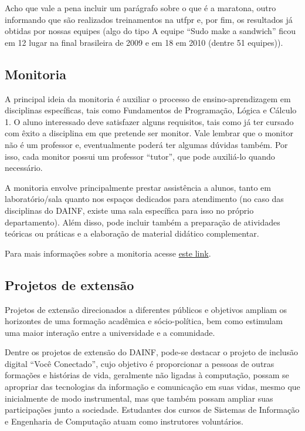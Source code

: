 \documentclass[a4paper,12pt,openany]{article}
\begin{document}
Acho que vale a pena incluir um parágrafo sobre o que é a maratona, outro informando que são realizados treinamentos na utfpr e, por fim, os resultados já obtidas por nossas equipes (algo do tipo A equipe ``Sudo make a sandwich'' ficou em 12 lugar na final brasileira de 2009 e em 18 em 2010 (dentre 51 equipes)).

\subsection{Monitoria}

A principal ideia da monitoria é auxiliar o processo de ensino-aprendizagem em disciplinas específicas, tais como Fundamentos de Programação, Lógica e Cálculo 1. O aluno interessado deve satisfazer alguns requisitos, tais como já ter cursado com êxito a disciplina em que pretende ser monitor. Vale lembrar que o monitor não é um professor e, eventualmente poderá ter algumas dúvidas também. Por isso, cada monitor possui um professor ``tutor'', que pode auxiliá-lo quando necessário.

A monitoria envolve principalmente prestar assistência a alunos, tanto em laboratório/sala quanto nos espaços dedicados para atendimento (no caso das disciplinas do DAINF, existe uma sala específica para isso no próprio departamento). Além disso, pode incluir também a preparação de atividades teóricas ou práticas e a elaboração de material didático complementar.

Para mais informações sobre a monitoria acesse \href{http://www.utfpr.edu.br/estrutura-universitaria/pro-reitorias/prograd/programas-academicos/programa-de-monitoria}{este link}.


\subsection{Projetos de extensão}

Projetos de extensão direcionados a diferentes públicos e objetivos ampliam os horizontes de uma formação acadêmica e sócio-política, bem como estimulam uma maior interação entre a universidade e a comunidade. 

Dentre os projetos de extensão do DAINF, pode-se destacar o projeto de inclusão digital ``Você Conectado'', cujo objetivo é proporcionar a pessoas de outras formações e histórias de vida, geralmente não ligadas à computação, possam se apropriar das tecnologias da informação e comunicação em suas vidas, mesmo que inicialmente de modo instrumental, mas que também possam ampliar suas participações junto a sociedade. Estudantes dos cursos de Sistemas de Informação e Engenharia de Computação atuam como instrutores voluntários. 
\end{document}

